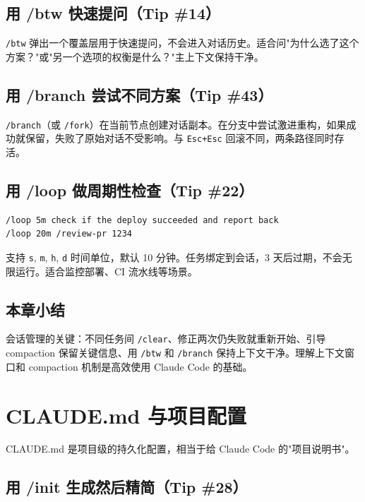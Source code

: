 \documentclass[a4paper]{article}
\begin{document}
\subsection{用 /btw 快速提问（Tip \#14）}

\texttt{/btw} 弹出一个覆盖层用于快速提问，不会进入对话历史。适合问"为什么选了这个方案？"或"另一个选项的权衡是什么？"主上下文保持干净。

\subsection{用 /branch 尝试不同方案（Tip \#43）}

\texttt{/branch}（或 \texttt{/fork}）在当前节点创建对话副本。在分支中尝试激进重构，如果成功就保留，失败了原始对话不受影响。与 \texttt{Esc+Esc} 回滚不同，两条路径同时存活。

\subsection{用 /loop 做周期性检查（Tip \#22）}

\begin{lstlisting}[caption={/loop 示例}, language=bash]
/loop 5m check if the deploy succeeded and report back
/loop 20m /review-pr 1234
\end{lstlisting}

支持 \texttt{s}, \texttt{m}, \texttt{h}, \texttt{d} 时间单位，默认 10 分钟。任务绑定到会话，3 天后过期，不会无限运行。适合监控部署、CI 流水线等场景。

\subsection{本章小结}

会话管理的关键：不同任务间 \texttt{/clear}、修正两次仍失败就重新开始、引导 compaction 保留关键信息、用 \texttt{/btw} 和 \texttt{/branch} 保持上下文干净。理解上下文窗口和 compaction 机制是高效使用 Claude Code 的基础。

\section{CLAUDE.md 与项目配置}

CLAUDE.md 是项目级的持久化配置，相当于给 Claude Code 的"项目说明书"。

\subsection{用 /init 生成然后精简（Tip \#28）}
\end{document}
